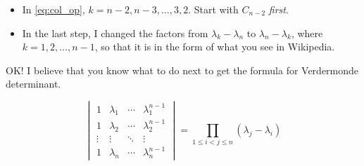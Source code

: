 \documentclass[a4paper]{article}
\begin{document}
\begin{itemize}
  \item In \eqref{eq:col_op}, $k = n - 2,n - 3,\dots,3,2$. Start with $C_{n - 2}$ \emph{first}.
  \item In the last step, I changed the factors from $\lambda_k - \lambda_n$ to $\lambda_n - \lambda_k$, where $k = 1,2,\dots,n - 1$, so that it is in the form of what you see in Wikipedia.
\end{itemize}

OK!  I believe that you know what to do next to get the formula for Verdermonde determinant.

\begin{equation*}
\boxed{
\begin{vmatrix}
1&\lambda_1 & \cdots & \lambda_1^{n - 1} \\
1&\lambda_2 & \cdots & \lambda_2^{n - 1} \\
\vdots  & \vdots & \ddots & \vdots \\
1&\lambda_n & \cdots & \lambda_n^{n - 1}
\end{vmatrix}
=
\prod_{1 \le i < j \le n} (\lambda_j - \lambda_i)
}
\end{equation*}
\end{document}
